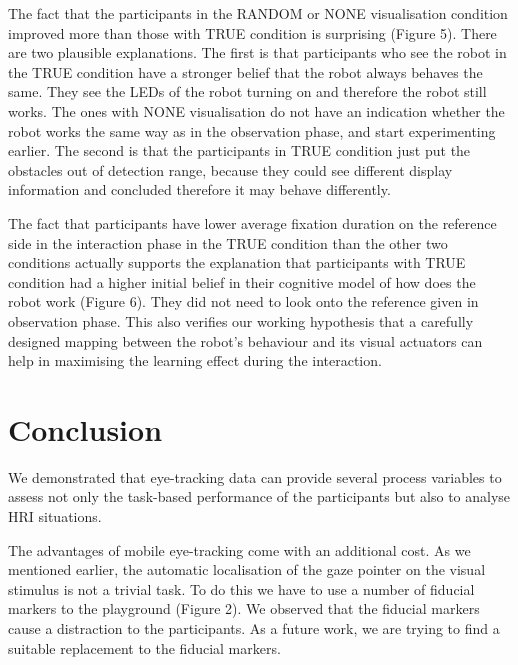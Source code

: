 \documentclass{sig-alternate}
\begin{document}
The fact that the participants in the {\sf RANDOM} or {\sf NONE} visualisation
condition improved more than those with {\sf TRUE} condition is surprising
(Figure 5). There are two plausible explanations. The first is that
participants who see the robot in the {\sf TRUE} condition have a stronger
belief that the robot always behaves the same. They see the LEDs of the
robot turning on and therefore the robot still works. The ones with {\sf NONE}
visualisation do not have an indication whether the robot works the same
way as in the observation phase, and start experimenting earlier. The
second is that the participants in {\sf TRUE} condition just put the obstacles
out of detection range, because they could see different display
information and concluded therefore it may behave differently.

The fact that participants have lower average fixation duration on the
reference side in the interaction phase in the {\sf TRUE} condition than the
other two conditions actually supports the explanation that participants
with {\sf TRUE} condition had a higher initial belief in their cognitive model
of how does the robot work (Figure 6). They did not need to look onto
the reference given in observation phase. This also verifies our working
hypothesis that a carefully designed mapping between the robot's
behaviour and its visual actuators can help in maximising the learning
effect during the interaction.


\section{Conclusion}


We demonstrated that eye-tracking data can provide several process
variables to assess not only the task-based performance of the
participants but also to analyse HRI situations.

The advantages of mobile eye-tracking come with an additional cost. As
we mentioned earlier, the automatic localisation of the gaze pointer on
the visual stimulus is not a trivial task. To do this we have to use a
number of fiducial markers to the playground (Figure 2). We observed
that the fiducial markers cause a distraction to the participants. As a
future work, we are trying to find a suitable replacement to the
fiducial markers.
\end{document}
